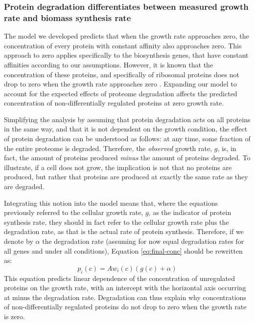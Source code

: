 \subsubsection{Protein degradation differentiates between measured growth rate and biomass synthesis rate}
The model we developed predicts that when the growth rate approaches zero, the concentration of every protein with constant affinity also approaches zero.
This approach to zero applies specifically to the biosynthesis genes, that have constant affinities according to our assumptions.
However, it is known that the concentration of these proteins, and specifically of ribosomal proteins does not drop to zero when the growth rate approaches zero \cite{ingraham1983growth}.
Expanding our model to account for the expected effects of proteome degradation affects the predicted concentration of non-differentially regulated proteins at zero growth rate.

Simplifying the analysis by assuming that protein degradation acts on all proteins in the same way, and that it is not dependent on the growth condition, the effect of protein degradation can be understood as follows: at any time, some fraction of the entire proteome is degraded.
Therefore, the \emph{observed} growth rate, $g$, is, in fact, the amount of proteins produced \emph{minus} the amount of proteins degraded.
To illustrate, if a cell does not grow, the implication is not that no proteins are produced, but rather that proteins are produced at exactly the same rate as they are degraded.

Integrating this notion into the model means that, where the equations previously referred to the cellular growth rate, $g$, as the indicator of protein synthesis rate, they should in fact refer to the cellular growth rate plus the degradation rate, as that is the actual rate of protein synthesis.
Therefore, if we denote by $\alpha$ the degradation rate (assuming for now equal degradation rates for all genes and under all conditions), Equation \ref{eq:final-conc} should be rewritten as:
\begin{equation}
  \label{eq:final-conc-deg}
  p_i(c)=Aw_i(c)(g(c)+\alpha)
\end{equation}
This equation predicts linear dependence of the concentration of unregulated proteins on the growth rate, with an intercept with the horizontal axis occurring at minus the degradation rate.
Degradation can thus explain why concentrations of non-differentially regulated proteins do not drop to zero when the growth rate is zero.